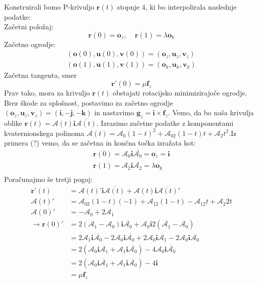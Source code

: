 \documentclass[mat1]{fmfdelo}
\newcommand{\rr}{\boldsymbol r}
\newcommand{\ii}{\boldsymbol i}
\newcommand{\jj}{\boldsymbol j}
\newcommand{\kk}{\boldsymbol k}
\newcommand{\oo}{\boldsymbol o}
\newcommand{\uu}{\boldsymbol u}
\newcommand{\vv}{\boldsymbol v}
\newcommand{\A}{\mathcal A}
\newcommand{\ff}{\boldsymbol f}
\newcommand{\g}{\boldsymbol g}
\begin{document}
Konstruirali bomo P-krivuljo $\rr(t)$ stopnje 4, ki bo interpolirala naslednje podatke:\\
Začetni položaj:
\begin{equation}
	\rr(0) = \oo_z, ~~~~~ \rr(1) = \lambda \oo_k
\end{equation}
Začetno ogrodje:
\begin{equation}
\begin{split}
	(\oo(0),\uu(0), \vv(0)) = (\oo_z, \uu_z, \vv_z)\\
(\oo(1),\uu(1), \vv(1)) = (\oo_k, \uu_k, \vv_k)
\end{split}
\end{equation}
Začetna tangenta, smer
\begin{equation}
	\rr '(0) = \mu \ff_z
\end{equation}
Prav tako, mora za krivuljo $\rr(t)$ obstajati rotacijsko minimizirajoče ogrodje.\\
Brez škode za splošnost, postavimo za začetno ogrodje $(\oo_z, \uu_z, \vv_z) = (\ii, - \jj, -\kk)$ in nastavimo $\g_z = \ii \times \ff_z$. Vemo, da bo naša krivulja oblike $\rr(t) = \A(t) \ii \overline{\A(t)}$. Izrazimo začetne podatke z komponentami kvaternionskega polinoma $\A(t) = \A_0(1-t)^2 + \A_02(1-t)t + \A_2t^2$.Iz primera (?) vemo, da se začetna in končna točka izražata kot:
\begin{equation}
	\begin{split}
	\rr(0) = \A_0 \ii\overline{\A_0} = \oo_z = \ii \\
		\rr(1) = \A_2 \ii\overline{\A_2} = \lambda \oo_k \\
	\end{split}
\end{equation}
Poračunajmo še tretji pogoj:
\begin{equation*}
\begin{split}
	\rr'(t) &= \A(t)' \ii \overline{\A(t)} + \A(t) \ii \overline{\A(t)}' \\
	\A(t)' &= \A_02(1-t)(-1) + \A_12(1-t) - \A_12t + \A_2 2t \\
	\A(0)' &= -\A_0 + 2 \A_1 \\
	\rightarrow \rr(0)' &= 2(\A_1-\A_0)\ii \overline{\A_0} + \A_0 \ii 2(\overline{\A_1} - \overline{\A_0}) \\
	&= 2\A_1 \ii \overline{\A_0} - 2 \A_0 \ii \overline{\A_0} + 2 \A_0 \ii \overline{\A_1}-2\A_0 \ii \overline{\A_0} \\
	&= 2(\A_0 \ii \overline{\A_1} + \A_1 \ii \overline{\A_0}) - 4 \A_0 \ii \overline{\A_0} \\
	&= 2(\A_0 \ii \overline{\A_1} + \A_1 \ii \overline{\A_0}) - 4 \ii \\
	&= \mu \ff_z
\end{split}
\end{equation*}
\end{document}
